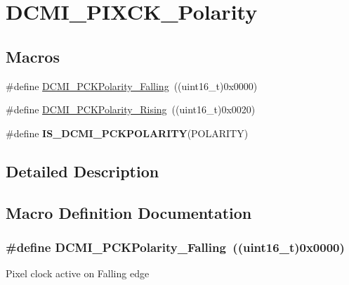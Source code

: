 \hypertarget{group___d_c_m_i___p_i_x_c_k___polarity}{\section{D\-C\-M\-I\-\_\-\-P\-I\-X\-C\-K\-\_\-\-Polarity}
\label{group___d_c_m_i___p_i_x_c_k___polarity}
}
\subsection*{Macros}
\begin{DoxyCompactItemize}
\item 
\#define \hyperlink{group___d_c_m_i___p_i_x_c_k___polarity_ga71fe5ad550cc63a754ea075d7b21fd78}{D\-C\-M\-I\-\_\-\-P\-C\-K\-Polarity\-\_\-\-Falling}~((uint16\-\_\-t)0x0000)
\item 
\#define \hyperlink{group___d_c_m_i___p_i_x_c_k___polarity_ga3835956f9c552c1a0438ee408d5046ca}{D\-C\-M\-I\-\_\-\-P\-C\-K\-Polarity\-\_\-\-Rising}~((uint16\-\_\-t)0x0020)
\item 
\#define {\bfseries I\-S\-\_\-\-D\-C\-M\-I\-\_\-\-P\-C\-K\-P\-O\-L\-A\-R\-I\-T\-Y}(P\-O\-L\-A\-R\-I\-T\-Y)
\end{DoxyCompactItemize}


\subsection{Detailed Description}


\subsection{Macro Definition Documentation}
\hypertarget{group___d_c_m_i___p_i_x_c_k___polarity_ga71fe5ad550cc63a754ea075d7b21fd78}{
\subsubsection[{D\-C\-M\-I\-\_\-\-P\-C\-K\-Polarity\-\_\-\-Falling}]{\setlength{\rightskip}{0pt plus 5cm}\#define D\-C\-M\-I\-\_\-\-P\-C\-K\-Polarity\-\_\-\-Falling~((uint16\-\_\-t)0x0000)}}\label{group___d_c_m_i___p_i_x_c_k___polarity_ga71fe5ad550cc63a754ea075d7b21fd78}
Pixel clock active on Falling edge 

